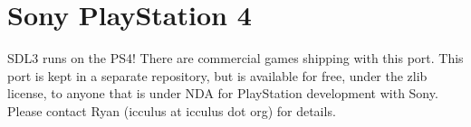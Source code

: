 \chapter{Sony Play\+Station 4 }
\hypertarget{md__mono_runtime_2extern_2sdl_2docs_2_r_e_a_d_m_e-ps4}{}\label{md__mono_runtime_2extern_2sdl_2docs_2_r_e_a_d_m_e-ps4}
\label{md__mono_runtime_2extern_2sdl_2docs_2_r_e_a_d_m_e-ps4_autotoc_md1434}%
%


SDL3 runs on the PS4! There are commercial games shipping with this port. This port is kept in a separate repository, but is available for free, under the zlib license, to anyone that is under NDA for Play\+Station development with Sony. Please contact Ryan (icculus at icculus dot org) for details. 